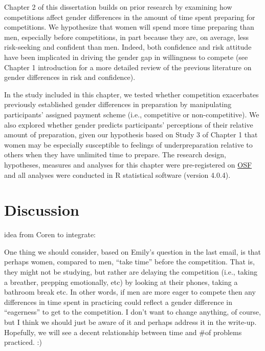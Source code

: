 \documentclass[a4paper, nobind]{templates/ociamthesis}
\begin{document}
Chapter 2 of this dissertation builds on prior research by examining how competitions affect gender differences in the amount of time spent preparing for competitions. We hypothesize that women will spend more time preparing than men, especially before competitions, in part because they are, on average, less risk-seeking \autocite{Croson2009,Dohmen2011b,Eckel2008,Bertrand2010a} and confident \autocite{Bertrand2010,Lundeberg1994,Mobius2011,Barber2001,Croson2009} than men. Indeed, both confidence and risk attitude have been implicated in driving the gender gap in willingness to compete \autocite{Niederle2011,Veldhuizen2017} (see Chapter 1 introduction for a more detailed review of the previous literature on gender differences in risk and confidence).

In the study included in this chapter, we tested whether competition exacerbates previously established gender differences in preparation by manipulating participants' assigned payment scheme (i.e., competitive or non-competitive). We also explored whether gender predicts participants' perceptions of their relative amount of preparation, given our hypothesis based on Study 3 of Chapter 1 that women may be especially susceptible to feelings of underpreparation relative to others when they have unlimited time to prepare. The research design, hypotheses, measures and analyses for this chapter were pre-registered on \href{INSERT\%20LINK}{OSF} and all analyses were conducted in R statistical software (version 4.0.4).

\hypertarget{discussion-4}{%
\section{Discussion}\label{discussion-4}}

idea from Coren to integrate:

One thing we should consider, based on Emily's question in the last email, is that perhaps women, compared to men, ``take time'' before the competition. That is, they might not be studying, but rather are delaying the competition (i.e., taking a breather, prepping emotionally, etc) by looking at their phones, taking a bathroom break etc. In other words, if men are more eager to compete then any differences in time spent in practicing could reflect a gender difference in ``eagerness'' to get to the competition. I don't want to change anything, of course, but I think we should just be aware of it and perhaps address it in the write-up. Hopefully, we will see a decent relationship between time and \#of problems practiced. :)
\end{document}
